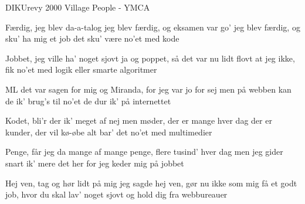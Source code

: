 {DIKUrevy 2000}
{Village People - YMCA}
{
Færdig, jeg blev da-a-talog
jeg blev færdig, og eksamen var go'
jeg blev færdig, og sku' ha mig et job
det sku' være no'et med kode

Jobbet, jeg ville ha' noget sjovt
ja og poppet, så det var nu lidt flovt
at jeg ikke, fik no'et med logik
eller smarte algoritmer



ML det var sagen for mig
og Miranda, for jeg var jo for sej
men på webben kan de ik' brug's til no'et
de dur ik' på internettet


Kodet, bli'r der ik' meget af
nej men møder, der er mange hver dag
der er kunder, der vil kø-øbe alt
bar' det no'et med multimedier




Penge, får jeg da mange af
mange penge, flere tusind' hver dag
men jeg gider snart ik' mere det her
for jeg keder mig på jobbet

Hej ven, tag og hør lidt på mig
jeg sagde hej ven, gør nu ikke som mig
få et godt job, hvor du skal lav' noget sjovt
og hold dig fra webbureauer


}